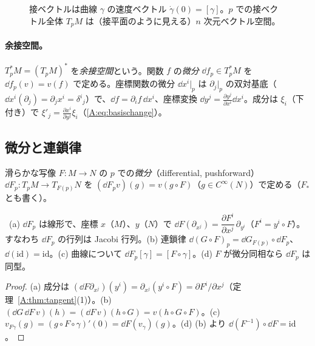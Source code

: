 \begin{figure}[htbp]
\centering
{}
\caption{接ベクトルは曲線 $\gamma$ の速度ベクトル $\dot\gamma(0)=[\gamma]$。$p$ での接ベクトル全体 $T_pM$ は（接平面のように見える）$n$ 次元ベクトル空間。}
\end{figure}

\paragraph{余接空間。}$T_p^*M=(T_pM)^*$ を\emph{余接空間}という。関数 $f$ の\emph{微分} $\dd f_p\in T_p^*M$ を $\dd f_p(v)=v(f)$ で定める。座標関数の微分 $\dd x^i|_p$ は $\partial_j|_p$ の双対基底（$\dd x^i(\partial_j)=\partial_jx^i=\delta^i{}_j$）で、$\dd f=\partial_if\,\dd x^i$、座標変換 $\dd y^j=\frac{\partial y^j}{\partial x^i}\dd x^i$。成分は $\xi_i$（下付き）で $\xi'_j=\frac{\partial x^i}{\partial y^j}\xi_i$（\eqref{A:eq:basischange}）。

\subsection{微分と連鎖律}
\begin{defn}
滑らかな写像 $F:M\to N$ の $p$ での\emph{微分}（differential, pushforward）$\dd F_p:T_pM\to T_{F(p)}N$ を $(\dd F_p v)(g)=v(g\circ F)$（$g\in C^\infty(N)$）で定める（$F_*$ とも書く）。
\end{defn}

\begin{prop}\label{A:prop:dF}
\tP\ (a) $\dd F_p$ は線形で、座標 $x$（$M$）、$y$（$N$）で $\dd F(\partial_{x^j})=\dfrac{\partial F^i}{\partial x^j}\,\partial_{y^i}$（$F^i=y^i\circ F$）。すなわち $\dd F_p$ の行列は Jacobi 行列。(b) 連鎖律 $\dd(G\circ F)_p=\dd G_{F(p)}\circ\dd F_p$、$\dd(\mathrm{id})=\mathrm{id}$。(c) 曲線について $\dd F_p[\gamma]=[F\circ\gamma]$。(d) $F$ が微分同相なら $\dd F_p$ は同型。
\end{prop}
\begin{proof}
(a) 成分は $(\dd F\partial_{x^j})(y^i)=\partial_{x^j}(y^i\circ F)=\partial F^i/\partial x^j$（定理~\ref{A:thm:tangent}(1)）。(b) $(\dd G\,\dd F\,v)(h)=(\dd F\,v)(h\circ G)=v(h\circ G\circ F)$。(c) $v_{F\gamma}(g)=(g\circ F\circ\gamma)'(0)=\dd F(v_\gamma)(g)$。(d) (b) より $\dd(F^{-1})\circ\dd F=\mathrm{id}$。
\end{proof}

